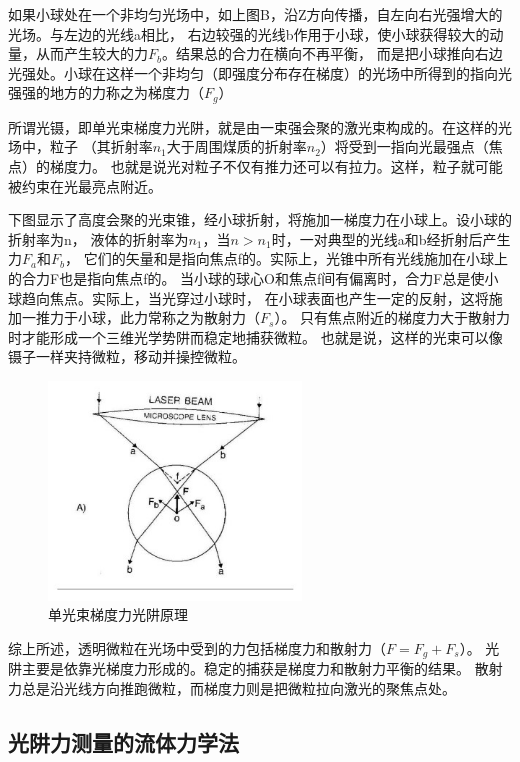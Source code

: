 \documentclass[a4paper,UTF8]{ctexart}
\begin{document}
如果小球处在一个非均匀光场中，如上图B，沿Z方向传播，自左向右光强增大的光场。与左边的光线a相比，
右边较强的光线b作用于小球，使小球获得较大的动量，从而产生较大的力$F_b$。结果总的合力在横向不再平衡，
而是把小球推向右边光强处。小球在这样一个非均匀（即强度分布存在梯度）的光场中所得到的指向光强强的地方的力称之为梯度力（$F_g$）

所谓光镊，即单光束梯度力光阱，就是由一束强会聚的激光束构成的。在这样的光场中，粒子
（其折射率$n_1$大于周围煤质的折射率$n_2$）将受到一指向光最强点（焦点）的梯度力。
也就是说光对粒子不仅有推力还可以有拉力。这样，粒子就可能被约束在光最亮点附近。

下图显示了高度会聚的光束锥，经小球折射，将施加一梯度力在小球上。设小球的折射率为n，
液体的折射率为$n_1$，当$n>n_1$时，一对典型的光线a和b经折射后产生力$F_a$和$F_b$，
它们的矢量和是指向焦点f的。实际上，光锥中所有光线施加在小球上的合力F也是指向焦点f的。
当小球的球心O和焦点f间有偏离时，合力F总是使小球趋向焦点。实际上，当光穿过小球时，
在小球表面也产生一定的反射，这将施加一推力于小球，此力常称之为散射力（$F_s$）。
只有焦点附近的梯度力大于散射力时才能形成一个三维光学势阱而稳定地捕获微粒。
也就是说，这样的光束可以像镊子一样夹持微粒，移动并操控微粒。

\begin{figure}[H]
    \centering
    \begin{minipage}[b]{0.9\textwidth}
        \centering
        \includegraphics[width=0.6\textwidth]{./fig2.jpg}
        \caption{单光束梯度力光阱原理}
    \end{minipage}
\end{figure}

综上所述，透明微粒在光场中受到的力包括梯度力和散射力（$F = F_g + F_s$）。
光阱主要是依靠光梯度力形成的。稳定的捕获是梯度力和散射力平衡的结果。
散射力总是沿光线方向推跑微粒，而梯度力则是把微粒拉向激光的聚焦点处。

\subsection{光阱力测量的流体力学法}
\end{document}
